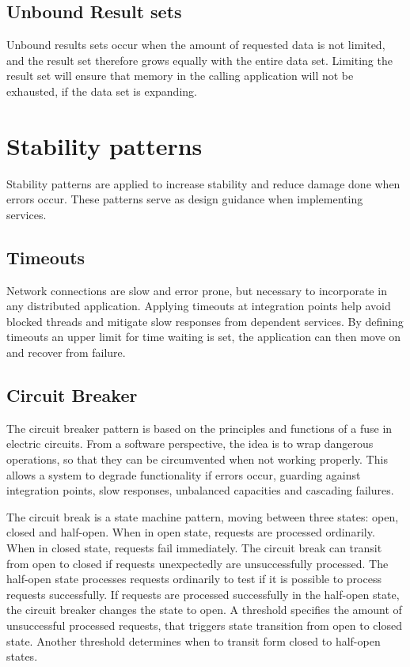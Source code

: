 \subsection{Unbound Result sets}
Unbound results sets occur when the amount of requested data is not limited, and the result set therefore grows equally with the entire data set. Limiting the result set will ensure that memory in the calling application will not be exhausted, if the data set is expanding.


\section{Stability patterns}
Stability patterns are applied to increase stability and reduce damage done when errors occur. These patterns serve as design guidance when implementing services.


\subsection{Timeouts}
Network connections are slow and error prone, but necessary to incorporate in any distributed application. Applying timeouts at integration points help avoid blocked threads and mitigate slow responses from dependent services. By defining timeouts an upper limit for time waiting is set, the application can then move on and recover from failure.


\subsection{Circuit Breaker}
The circuit breaker pattern is based on the principles and functions of a fuse in electric circuits. From a software perspective, the idea is to wrap dangerous operations, so that they can be circumvented when not working properly. This allows a system to degrade functionality if errors occur, guarding against integration points, slow responses, unbalanced capacities and cascading failures.

The circuit break is a state machine pattern, moving between three states: open, closed and half-open. When in open state, requests are processed ordinarily. When in closed state, requests fail immediately. The circuit break can transit from open to closed if requests unexpectedly are unsuccessfully processed. The half-open state processes requests ordinarily to test if it is possible to process requests successfully. If requests are processed successfully in the half-open state, the circuit breaker changes the state to open. A threshold specifies the amount of unsuccessful processed requests, that triggers state transition from open to closed state. Another threshold determines when to transit form closed to half-open states.

